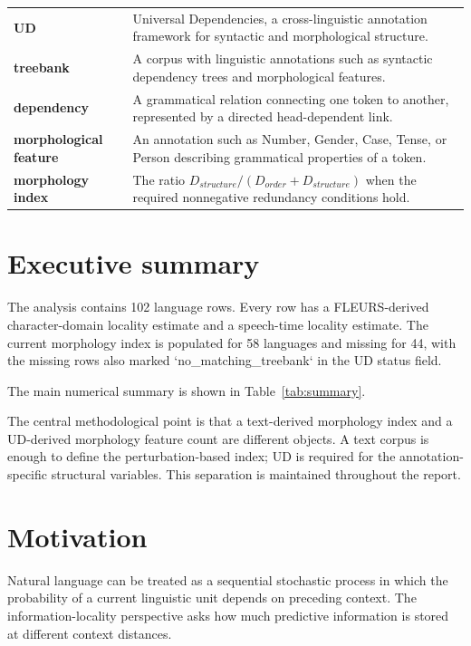 \documentclass[11pt]{article}
\begin{document}
\begin{longtable}{p{}p{}}
\textbf{UD} & Universal Dependencies, a cross-linguistic annotation framework for syntactic and morphological structure.\\
\textbf{treebank} & A corpus with linguistic annotations such as syntactic dependency trees and morphological features.\\
\textbf{dependency} & A grammatical relation connecting one token to another, represented by a directed head-dependent link.\\
\textbf{morphological feature} & An annotation such as Number, Gender, Case, Tense, or Person describing grammatical properties of a token.\\
\textbf{morphology index} & The ratio $D_{structure}/(D_{order}+D_{structure})$ when the required nonnegative redundancy conditions hold.\\
\bottomrule
\end{longtable}

\section{Executive summary}
The analysis contains 102 language rows. Every row has a FLEURS-derived character-domain locality estimate and a speech-time locality estimate. The current morphology index is populated for 58 languages and missing for 44, with the missing rows also marked `no\_matching\_treebank` in the UD status field.

The main numerical summary is shown in Table~\ref{tab:summary}.

\begin{table}[H]\centering
\caption{Core numerical summary of the current analysis.}\label{tab:summary}

\end{table}

The central methodological point is that a text-derived morphology index and a UD-derived morphology feature count are different objects. A text corpus is enough to define the perturbation-based index; UD is required for the annotation-specific structural variables. This separation is maintained throughout the report.

\section{Motivation}
Natural language can be treated as a sequential stochastic process in which the probability of a current linguistic unit depends on preceding context. The information-locality perspective asks how much predictive information is stored at different context distances.
\end{document}
